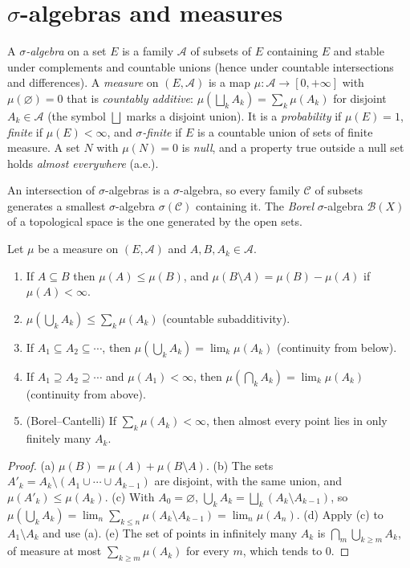 \section{\texorpdfstring{$\sigma$}{Sigma}-algebras and measures}

\begin{definition}
A \emph{$\sigma$-algebra} on a set $E$ is a family $\mathcal A$ of subsets of $E$ containing $E$ and stable under complements and countable unions (hence under
countable intersections and differences). A \emph{measure} on $(E,\mathcal A)$ is a map $\mu:\mathcal A\to[0,+\infty]$ with $\mu(\varnothing)=0$ that is \emph{countably additive}: $\mu(\bigsqcup_kA_k)=\sum_k\mu(A_k)$
for disjoint $A_k\in\mathcal A$ (the symbol $\bigsqcup$ marks a disjoint union). It is a \emph{probability} if $\mu(E)=1$, \emph{finite} if $\mu(E)<\infty$, and \emph{$\sigma$-finite} if $E$ is a countable
union of sets of finite measure. A set $N$ with $\mu(N)=0$ is \emph{null}, and a property true outside a null set holds \emph{almost everywhere} (a.e.).
\end{definition}

An intersection of $\sigma$-algebras is a $\sigma$-algebra, so every family $\mathcal C$ of subsets generates a smallest $\sigma$-algebra $\sigma(\mathcal C)$ containing it. The
\emph{Borel} $\sigma$-algebra $\mathcal B(X)$ of a topological space is the one generated by the open sets.

\begin{proposition}\label{prop:measureprops}
Let $\mu$ be a measure on $(E,\mathcal A)$ and $A,B,A_k\in\mathcal A$.
\begin{enumerate}[label=(\alph*)]
\item If $A\subseteq B$ then $\mu(A)\le\mu(B)$, and $\mu(B\setminus A)=\mu(B)-\mu(A)$ if $\mu(A)<\infty$.
\item $\mu(\bigcup_kA_k)\le\sum_k\mu(A_k)$ (countable subadditivity).
\item If $A_1\subseteq A_2\subseteq\cdots$, then $\mu(\bigcup_kA_k)=\lim_k\mu(A_k)$ (continuity from below).
\item If $A_1\supseteq A_2\supseteq\cdots$ and $\mu(A_1)<\infty$, then $\mu(\bigcap_kA_k)=\lim_k\mu(A_k)$ (continuity from above).
\item (Borel--Cantelli) If $\sum_k\mu(A_k)<\infty$, then almost every point lies in only finitely many $A_k$.
\end{enumerate}
\end{proposition}
\begin{proof}
(a) $\mu(B)=\mu(A)+\mu(B\setminus A)$. (b) The sets $A'_k=A_k\setminus(A_1\cup\cdots\cup A_{k-1})$ are disjoint, with the same union, and $\mu(A'_k)\le\mu(A_k)$. (c) With $A_0=\varnothing$,
$\bigcup_kA_k=\bigsqcup_k(A_k\setminus A_{k-1})$, so $\mu(\bigcup_kA_k)=\lim_n\sum_{k\le n}\mu(A_k\setminus A_{k-1})=\lim_n\mu(A_n)$. (d) Apply (c) to $A_1\setminus A_k$ and use (a). (e) The set of
points in infinitely many $A_k$ is $\bigcap_m\bigcup_{k\ge m}A_k$, of measure at most $\sum_{k\ge m}\mu(A_k)$ for every $m$, which tends to $0$.
\end{proof}


